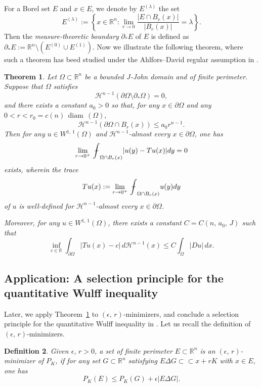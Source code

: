\documentclass[reqno,11pt]{amsart}
\makeatletter
\def\ez{\epsilon}
\def\bint{{\ifinner\rlap{\bf\kern.35em--}
\int\else\rlap{\bf\kern.45em--}\int\fi}\ignorespaces}
\def\diam{{\mathop\mathrm{\,diam\,}}}
\newtheorem{thm}{Theorem}[section]
\newtheorem{defn}[thm]{Definition}%
\numberwithin{equation}{section}
\theoremstyle{remark}
\def\bint{{\ifinner\rlap{\bf\kern.35em--}
\int\else\rlap{\bf\kern.45em--}\int\fi}\ignorespaces}
\makeatother
\begin{document}
For a Borel set $E$ and 
$x\in E$, we denote by $E^{(\lambda)}$ the set 
$$E^{(\lambda)}:=\left\{x\in\mathbb R^n: \lim_{r\to 0}\frac{|E\cap B_r(x)|}{|B_r(x)|}=\lambda\right\}.$$
Then the \emph{measure-theoretic boundary} $\partial_* E$ of $E$ is defined as $\partial_* E:=\mathbb R^n\setminus (E^{(0)}\cup E^{(1)})$.
Now we  illustrate  the following theorem, where such a theorem has beed studied under the Ahlfors--David regular assumption in \cite[Section 7]{DS1998}.
\begin{thm}\label{trace inequ}
Let  $\Omega\subset\mathbb R^n$ be a bounded $J$-John domain and of finite perimeter. Suppose that $\Omega$ satisfies
\begin{equation}\label{almost reduce}
    \mathcal H^{n-1}(\partial \Omega\setminus \partial_*\Omega)=0,
\end{equation} 
and there exists a constant $a_0>0$ so that, for  any $x\in \partial \Omega$ and any $0<r<r_0=c(n)\diam(\Omega),$   
\begin{equation}\label{hau cond 1}
    \mathcal H^{n-1}(\partial \Omega\cap B_{r}(x))\le a_0r^{n-1}. 
\end{equation}
Then for any $u\in W^{1,\,1}(\Omega)$ and $\mathcal H^{n-1}$-almost every $x\in \partial \Omega$, one has
\begin{equation}\label{trace defi}
    \lim_{r\to 0^{+}}\bint_{\Omega\cap B_r(x)}|u(y)-Tu(x)|dy=0
\end{equation}
exists, wherein the trace 
$$Tu(x):=\lim_{r\to 0^{+}}\bint_{\Omega\cap B_r(x)}u(y)dy$$ 
of $u$
is well-defined for $\mathcal H^{n-1}$-almost every   $x\in \partial \Omega$. 
 

Moreover, for any $u\in W^{1,\,1} (\Omega)$, there exists a constant $C=C(n,\, a_0,\,J)$ such that 
\begin{equation}\label{trace conseq}
    \inf_{c\in \mathbb R}\int_{\partial \Omega} |Tu(x)-c|  \, d\mathcal H^{n-1}(x) \le C\int_{\Omega} |Du|\, dx.
\end{equation}
\end{thm}



\subsection{Application: A selection principle for the quantitative Wulff inequality}

Later, we apply Theorem~\ref{trace inequ} to $(\ez,\,r)$-minimizers, and conclude a selection principle for the quantitative Wulff inequality in \cite{FMP2010}. Let us recall the definition of $(\ez,\,r)$-minimizers. 
\begin{defn}\label{ez r}
   Given $\ez,\,r>0$, a set of finite perimeter $E\subset \mathbb R^n$ is an $(\ez,\,r)$-minimizer of $P_K$, if for any set $G\subset \mathbb R^n$ satisfying $E\Delta G\subset \subset x+rK$ with $x\in E$, one has
$$P_K(E)\le P_K(G)+ \ez |E\Delta G|.$$
\end{defn}
\end{document}
